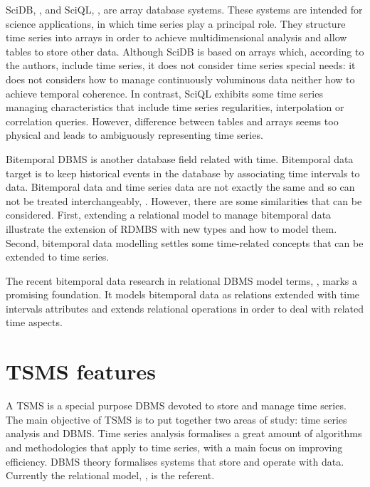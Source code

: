 SciDB, \cite{stonebraker09:scidb}, and SciQL, \cite{zhang11}, are
array database systems. These systems are intended for science
applications, in which time series play a principal role. They
structure time series into arrays in order to achieve multidimensional
analysis and allow tables to store other data.  Although SciDB is
based on arrays which, according to the authors, include time series,
it does not consider time series special needs: it does not considers
how to manage continuously voluminous data neither how to achieve
temporal coherence.  In contrast, SciQL exhibits some time series
managing characteristics that include time series regularities,
interpolation or correlation queries.  However, difference between
tables and arrays seems too physical and leads to ambiguously
representing time series.

Bitemporal DBMS is another database field related with
time. Bitemporal data target is to keep historical events in the
database by associating time intervals to data.  Bitemporal data and
time series data are not exactly the same and so can not be treated
interchangeably, \cite{schmidt95}. However, there are some
similarities %
that can be considered. First, extending a relational model to manage
bitemporal data illustrate the extension of RDMBS with new types and
how to model them. Second, bitemporal data modelling settles some
time-related concepts that can be extended to time series.

The recent bitemporal data research in relational DBMS model terms,
\cite{date02:_tempor_data_relat_model}, marks a promising
foundation. It models bitemporal data as relations extended with time
intervals attributes and extends relational operations in order to
deal with related time aspects.





\section{TSMS features}
\label{sec:tsms-features}

A TSMS is a special purpose DBMS devoted to store and manage time
series. The main objective of TSMS is to put together two areas of
study: time series analysis and DBMS.  Time series analysis formalises
a great amount of algorithms and methodologies that apply to time
series, with a main focus on improving efficiency. DBMS theory
formalises systems that store and operate with data. Currently the
relational model, \cite{date:introduction}, is the referent.

